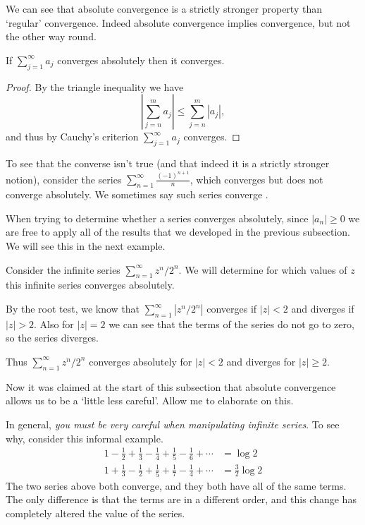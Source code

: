 We can see that absolute convergence is a strictly stronger property than `regular' convergence. Indeed absolute convergence implies convergence, but not the other way round.

\begin{theorem}
	If $\sum_{j = 1}^{\infty} a_j$ converges absolutely then it converges.
\end{theorem}
\begin{proof}
	By the triangle inequality we have
	$$
	\left|\sum_{j = n}^m a_j\right| \leq \sum_{j = n}^m \left|a_j\right|,
	$$
	and thus by Cauchy's criterion $\sum_{j = 1}^{\infty} a_j$ converges.
\end{proof}

To see that the converse isn't true (and that indeed it is a strictly stronger notion), consider the series $\sum_{n = 1}^{\infty} \frac{(-1)^{n + 1}}{n}$, which converges but does not converge absolutely. We sometimes say such series converge . 

When trying to determine whether a series converges absolutely, since $|a_n| \geq 0$ we are free to apply all of the results that we developed in the previous subsection. We will see this in the next example.

\begin{example}
	Consider the infinite series $\sum_{n = 1}^{\infty} z^n/2^n$. We will determine for which values of $z$ this infinite series converges absolutely.
	
	By the root test, we know that $\sum_{n = 1}^{\infty} |z^n/2^n|$ converges if $|z| < 2$ and diverges if $|z| > 2$. Also for $|z| = 2$ we can see that the terms of the series do not go to zero, so the series diverges.

	Thus $\sum_{n = 1}^{\infty} z^n/2^n$ converges absolutely for $|z| < 2$ and diverges for $|z| \geq 2$.
\end{example}

Now it was claimed at the start of this subsection that absolute convergence allows us to be a `little less careful'. Allow me to elaborate on this. 


In general, \emph{\color{red} you must be very careful when manipulating infinite series}. To see why, consider this informal example.
\begin{align*}
	1-\frac{1}{2}+\frac{1}{3}-\frac{1}{4}+\frac{1}{5}-\frac{1}{6}+\cdots &= \log 2 \\
	1+\frac{1}{3}-\frac{1}{2}+\frac{1}{5}+\frac{1}{7}-\frac{1}{4}+\cdots &= \frac{3}{2} \log 2
\end{align*}
The two series above both converge, and they both have all of the same terms. The only difference is that the terms are in a different order, and this change has completely altered the value of the series.

